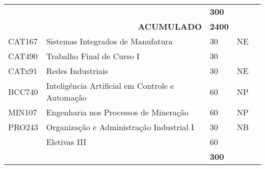 \begin{table}[]
{\begin{tabular}{l|l|l|l|l}
			\multicolumn{1}{|l|}{}                              &                                                          & \textbf{300}                                                 &                         &  \\ \cline{1-4}
			\multicolumn{1}{|l|}{}                              & \multicolumn{1}{r|}{\textbf{ACUMULADO}}                  & \textbf{2400}                                                &                         &  \\ \cline{1-4}
			\multicolumn{1}{|l|}{CAT167}                        & Sistemas Integrados de Manufatura                        & 30                                                           & NE                      &  \\ \cline{1-4}
			\multicolumn{1}{|l|}{{\color[HTML]{3531FF} CAT490}} & {\color[HTML]{3531FF} Trabalho Final de Curso I}         & {\color[HTML]{3531FF} 30}                                    & {\color[HTML]{3531FF} } &  \\ \cline{1-4}
			\multicolumn{1}{|l|}{CATx91}                        & Redes Industriais                                        & 30                                                           & NE                      &  \\ \cline{1-4}
			\multicolumn{1}{|l|}{BCC740}                        & Inteligência Artificial em Controle e Automação          & 60                                                           & NP                      &  \\ \cline{1-4}
			\multicolumn{1}{|l|}{MIN107}                        & Engenharia nos Processos de Mineração                    & 60                                                           & NP                      &  \\ \cline{1-4}
			\multicolumn{1}{|l|}{PRO243}                        & Organização e Administração Industrial I                 & 30                                                           & NB                      &  \\ \cline{1-4}
			\multicolumn{1}{|l|}{}                              & {\color[HTML]{009901} Eletivas III}                      & {\color[HTML]{009901} 60}                                    & {\color[HTML]{009901} } &  \\ \cline{1-4}
			\multicolumn{1}{|l|}{}                              &                                                          & \textbf{300}                                                 &                         &  \\ \cline{1-4}

\end{tabular}}
\end{table}

